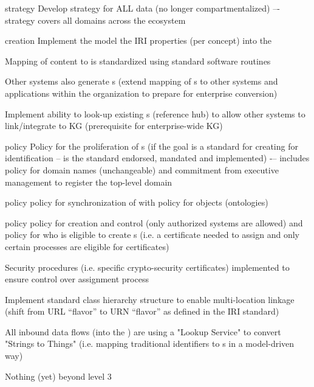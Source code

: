 \kgmmscoringlevelTwo

\begin{scoring}

  \item [strategy] Develop strategy for ALL data (no longer compartmentalized) –- strategy covers all domains across
        the ecosystem
  \item [creation] Implement the model the IRI properties (per concept) into the 
  \item Mapping of content to  is standardized using standard software routines
  \item Other systems also generate s (extend mapping of s to other systems and
        applications within the organization to prepare for enterprise conversion)
  \item Implement ability to look-up existing s (reference hub) to allow other systems to
        link/integrate to KG (prerequisite for enterprise-wide KG)
  \item [policy] Policy for the proliferation of s (if the goal is a standard for creating for
        identification -- is the standard endorsed, mandated and implemented) -– includes policy
        for domain names (unchangeable) and commitment from executive management to register the top-level domain
  \item [policy] policy for synchronization of  with policy for objects (ontologies)
  \item [policy] policy for creation and control (only authorized systems are allowed) and policy for who is
        eligible to create s (i.e. a certificate needed to assign and only certain processes are
        eligible for certificates)

\end{scoring}

\kgmmscoringlevelThree

\begin{scoring}

  \item Security procedures (i.e. specific crypto-security certificates) implemented to ensure control over
         assignment process
  \item Implement standard  class hierarchy structure to enable multi-location linkage (shift from
        URL “flavor” to URN “flavor” as defined in the IRI standard)
  \item All inbound data flows (into the ) are using a "Lookup Service" to convert "Strings to Things"
        (i.e. mapping traditional identifiers to s in a model-driven way)

\end{scoring}

Nothing (yet) beyond level 3
